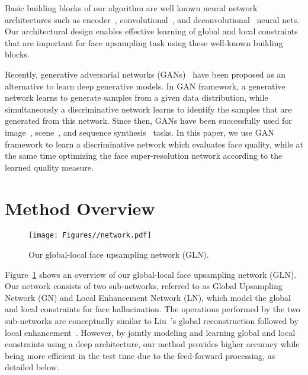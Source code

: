 \documentclass[runningheads]{llncs}
\begin{document}
Basic building blocks of our algorithm are well known neural network architectures such as encoder~\cite{Hinton06,Vincent08,ngiam2011multimodal}, convolutional~\cite{lecun1998gradient}, and deconvolutional~\cite{zeiler2010deconvolutional,Long15} neural nets. Our architectural design enables effective learning of global and local constraints that are important for face upsampling task using these well-known building blocks.

Recently, generative adversarial networks (GANs)~\cite{Goodfellow14} have been proposed as an alternative to learn deep generative models. In GAN framework, a generative network learns to generate samples from a given data distribution, while simultaneously a discriminative network learns to identify the samples that are generated from this network. Since then, GANs have been successfully used for image~\cite{Goodfellow14,Denton15}, scene~\cite{Radford15}, and sequence synthesis~\cite{Lotter15} tasks. In this paper, we use GAN framework to learn a discriminative network which evaluates face quality, while at the same time optimizing the face super-resolution network according to the learned quality measure.


\section{Method Overview}

\begin{figure}[tb]
  \centering
  \texttt{[image: Figures//network.pdf]}
  \vspace{-3mm}
  \caption{Our global-local face upsampling network (GLN).}
\label{fig:Overview}
\end{figure}


Figure~\ref{fig:Overview} shows an overview of our global-local face upsampling network (GLN). Our network consists of two sub-networks, referred to as Global Upsampling Network (GN) and Local Enhancement Network (LN), which model the global and local constraints for face hallucination. The operations performed by the two sub-networks are conceptually similar to Liu~\etal's global reconstruction followed by local enhancement~\cite{Liu07}.
However, by jointly modeling and learning global and local constraints using a deep architecture, our method provides higher accuracy while being more efficient in the test time due to the feed-forward processing, as detailed below.
\end{document}
